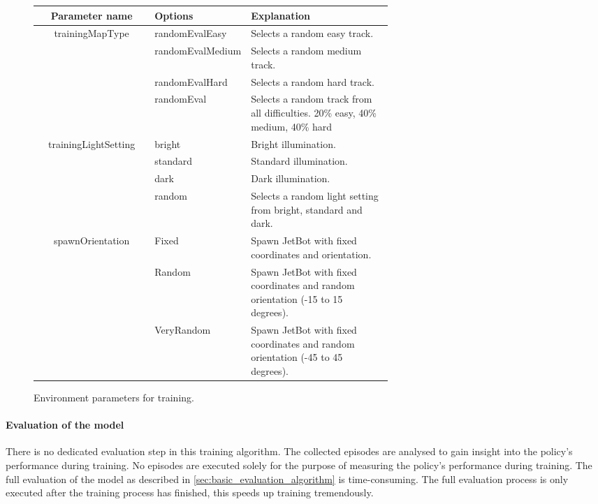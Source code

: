 \begin{figure}
    
    \begin{center}
    \begin{tabular}{|| c | p{0.25\linewidth} | p{0.4\linewidth} ||} 
        \hline
        Parameter name & Options & Explanation  \\ [0.5ex] 
        \hline\hline
        \multirow{4}{*}{trainingMapType} & randomEvalEasy & Selects a random easy track. \\\cline{2-3}
        & randomEvalMedium & Selects a random medium track. \\\cline{2-3}
        & randomEvalHard & Selects a random hard track. \\\cline{2-3}
        & randomEval & Selects a random track from all difficulties. 20\% easy, 40\% medium, 40\% hard \\
        \hline
        \multirow{4}{*}{trainingLightSetting} & bright & Bright illumination. \\\cline{2-3}
        & standard & Standard illumination. \\\cline{2-3}
        & dark & Dark illumination. \\\cline{2-3}
        & random & Selects a random light setting from bright, standard and dark. \\
        \hline
        \multirow{4}{*}{spawnOrientation} & Fixed & Spawn JetBot with fixed coordinates and orientation. \\\cline{2-3}
        & Random & Spawn JetBot with fixed coordinates and random orientation (-15 to 15 degrees). \\\cline{2-3}
        & VeryRandom & Spawn JetBot with fixed coordinates and random orientation (-45 to 45 degrees). \\
        \hline
    \end{tabular}
    \end{center}
    \caption{Environment parameters for training.} %
    \label{fig:env_reset_settings}
\end{figure}

\paragraph{Evaluation of the model}

There is no dedicated evaluation step in this training algorithm. The collected episodes are analysed to gain insight into the policy's performance during training. No episodes are executed solely for the purpose of measuring the policy's performance during training. The full evaluation of the model as described in \ref{sec:basic_evaluation_algorithm} is time-consuming. The full evaluation process is only executed after the training process has finished, this speeds up training tremendously.

